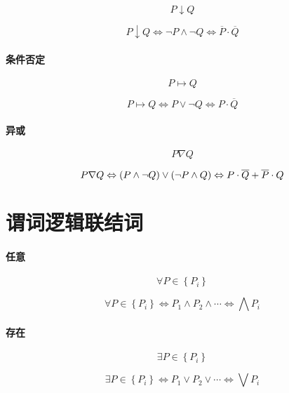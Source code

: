 \documentclass{article}
\begin{document}
\[P\downarrow Q\]

\begin{definition}
    \[P\downarrow Q
        \Leftrightarrow\neg P \wedge\neg Q
        \Leftrightarrow\overline P\cdot\overline Q\]
\end{definition}

\paragraph{条件否定}

\[P\mapsto Q\]

\begin{definition}
    \[P\mapsto Q
        \Leftrightarrow P \vee\neg Q
        \Leftrightarrow P\cdot\overline Q\]
\end{definition}

\paragraph{异或}

\[P\nabla Q\]

\begin{definition}
    \[P\nabla Q
        \Leftrightarrow\left(P\wedge\neg Q\right)\vee\left(\neg P\wedge Q\right)
        \Leftrightarrow P\cdot\overline Q+\overline P\cdot Q\]
\end{definition}

\section{谓词逻辑联结词}

\paragraph{任意}

\[\forall P\in\left\{P_i\right\}\]

\begin{definition}
    \[\forall P\in\left\{P_i\right\}
        \Leftrightarrow P_1\wedge P_2\wedge\cdots
        \Leftrightarrow\bigwedge P_i\]
\end{definition}

\paragraph{存在}

\[\exists P\in\left\{P_i\right\}\]

\begin{definition}
    \[\exists P\in\left\{P_i\right\}
        \Leftrightarrow P_1\vee P_2\vee\cdots
        \Leftrightarrow\bigvee P_i\]
\end{definition}
\end{document}
